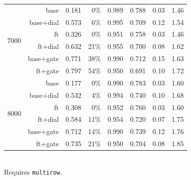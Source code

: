 \begin{table}[t]
\begin{tabular}{lrrrrrrr}
    \midrule
    \multirow{6}{*}{7000} & base & 0.181 & 0\% & 0.989 & 0.788 & 0.03 & 1.46 \\
     & base$+$dial & 0.573 & 6\% & 0.995 & 0.709 & 0.12 & 1.54 \\
     & ft & 0.326 & 0\% & 0.951 & 0.758 & 0.03 & 1.46 \\
     & ft$+$dial & 0.632 & 21\% & 0.955 & 0.700 & 0.08 & 1.62 \\
     & base$+$gate & 0.771 & 38\% & 0.990 & 0.712 & 0.15 & 1.63 \\
     & ft$+$gate & 0.797 & 54\% & 0.950 & 0.691 & 0.10 & 1.72 \\
    \midrule
    \multirow{6}{*}{8000} & base & 0.177 & 0\% & 0.990 & 0.783 & 0.03 & 1.60 \\
     & base$+$dial & 0.532 & 4\% & 0.994 & 0.740 & 0.10 & 1.68 \\
     & ft & 0.308 & 0\% & 0.952 & 0.760 & 0.03 & 1.60 \\
     & ft$+$dial & 0.584 & 11\% & 0.954 & 0.720 & 0.07 & 1.75 \\
     & base$+$gate & 0.712 & 14\% & 0.990 & 0.739 & 0.12 & 1.76 \\
     & ft$+$gate & 0.735 & 21\% & 0.950 & 0.704 & 0.08 & 1.85 \\
    \bottomrule
  \end{tabular}
  \vspace{2pt}\\ \footnotesize Requires \texttt{multirow}.
\end{table}
